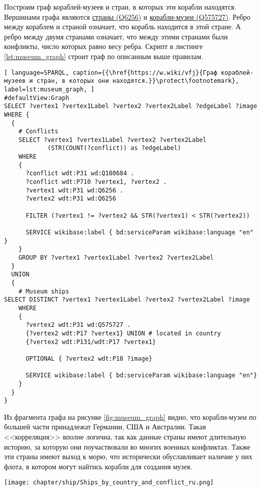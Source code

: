 Построим граф кораблей-музеев и стран, в которых эти корабли находятся. Вершинами графа являются \href{https://www.wikidata.org/wiki/Q6256}{страны (Q6256)} и \href{https://www.wikidata.org/wiki/Q575727}{корабли-музеи (Q575727)}. Ребро между кораблем и страной означает, что корабль находится в этой стране. А ребро между двумя странами означает, что между этими странами были конфликты, число которых равно весу ребра. Скрипт в листинге \ref{lst:museum_graph} строит граф по описанным выше правилам.

\begin{lstlisting}[ language=SPARQL, caption={{\href{https://w.wiki/vfj}{Граф кораблей-музеев и стран, в которых они находятся.}}\protect\footnotemark}, label=lst:museum_graph, ]
#defaultView:Graph    
SELECT ?vertex1 ?vertex1Label ?vertex2 ?vertex2Label ?edgeLabel ?image 
WHERE {
  {
    # Conflicts
    SELECT ?vertex1 ?vertex1Label ?vertex2 ?vertex2Label 
            (STR(COUNT(?conflict)) as ?edgeLabel) 
    WHERE
    {
      ?conflict wdt:P31 wd:Q180684 .
      ?conflict wdt:P710 ?vertex1, ?vertex2 .
      ?vertex1 wdt:P31 wd:Q6256 . 
      ?vertex2 wdt:P31 wd:Q6256

      FILTER (?vertex1 != ?vertex2 && STR(?vertex1) < STR(?vertex2))
    
      SERVICE wikibase:label { bd:serviceParam wikibase:language "en" }
    }
    GROUP BY ?vertex1 ?vertex1Label ?vertex2 ?vertex2Label
  }
  UNION
  {
    # Museum ships
SELECT DISTINCT ?vertex1 ?vertex1Label ?vertex2 ?vertex2Label ?image
    WHERE
    {
      ?vertex2 wdt:P31 wd:Q575727 .
      {?vertex2 wdt:P17 ?vertex1} UNION # located in country
      {?vertex2 wdt:P131/wdt:P17 ?vertex1}
        
      OPTIONAL { ?vertex2 wdt:P18 ?image}
        
      SERVICE wikibase:label { bd:serviceParam wikibase:language "en"}
    }
  }
}
\end{lstlisting}

Из фрагмента графа на рисунке \ref{fig:museum_graph} видно, что корабли-музеи по большей части принадлежат Германии, США и Австралии. Такая <<корреляция>> вполне логична, так как данные страны имеют длительную историю, за которую они поучаствовали во многих военных конфликтах. Также эти страны имеют выход к морю, что исторически обуславливает наличие у них флота, в котором могут найтись корабли для создания музея.


\begin{figure*}[ht]
  \texttt{[image: chapter/ship/Ships\_by\_country\_and\_conflict\_ru.png]}
  \caption[Список кораблей и конфликтов, в которых они участвовали]{Фрагмент cписка кораблей, связанных с Россией и участвовавших в военных конфликтах, 2017 год. Из списка видно, что больше большая часть кораблей связаны с Россией и СССР, а также со Второй мировой или Великой Отечественной войнами.}%
  \label{fig:ships_by_country_and_conflict}%
\end{figure*}
